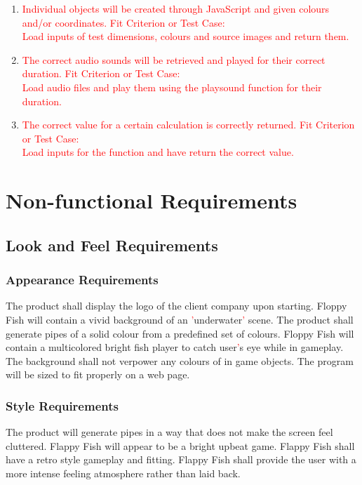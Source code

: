 \documentclass[11pt, oneside]{article}   	%
\begin{document}
\begin{enumerate}
\item
\textcolor{red}{Individual objects will be created through JavaScript and given colours and/or coordinates.}
\subitem
\textcolor{red}{Fit Criterion or Test Case:} \\
\textcolor{red}{Load inputs of test dimensions, colours and source images and return them.} 

\item
\textcolor{red}{The correct audio sounds will be retrieved and played for their correct duration.}
\subitem
\textcolor{red}{Fit Criterion or Test Case:} \\
\textcolor{red}{Load audio files and play them using the playsound function for their duration.} 

\item
\textcolor{red}{The correct value for a certain calculation is correctly returned.}
\subitem
\textcolor{red}{Fit Criterion or Test Case:} \\
\textcolor{red}{Load inputs for the function and have return the correct value.} 

\end{enumerate}

\newpage
\section{Non-functional Requirements}
\subsection{Look and Feel Requirements}
\subsubsection{Appearance Requirements}
The product shall display the logo of the client company upon starting. Floppy Fish will contain a vivid background of an \textcolor{red}{'}underwater\textcolor{red}{'} scene. The product shall generate pipes of a solid colour from a predefined set of colours. Floppy Fish will contain a multicolored bright fish player to catch user\textcolor{red}{'}s eye while in gameplay. The background shall not verpower any colours of in game objects. The program will be sized to fit properly on a web page.


\subsubsection{Style Requirements}
The product will generate pipes in a way that does not make the screen feel cluttered. Flappy Fish will appear to be a bright upbeat game. Flappy Fish shall have a retro style gameplay and fitting. Flappy Fish shall provide the user with a more intense feeling atmosphere rather than laid back. 
\end{document}
